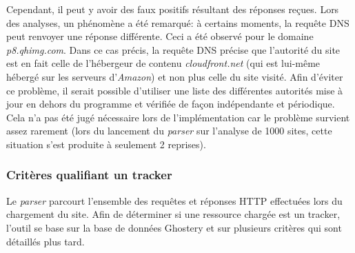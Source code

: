 %	

%	


Cependant, il peut y avoir des faux positifs résultant des réponses reçues. Lors des analyses, un phénomène a été remarqué: à certains moments, la requête DNS peut renvoyer une réponse différente. Ceci a été observé pour le domaine \textit{p8.qhimg.com}. %
Dans ce cas précis, la requête DNS précise que l'autorité du site est en fait celle de l'hébergeur de contenu \textit{cloudfront.net} (qui est lui-même hébergé sur les serveurs d'\textit{Amazon}) et non plus celle du site visité. Afin d'éviter ce problème, il serait possible d'utiliser une liste des différentes autorités mise à jour en dehors du programme et vérifiée de façon indépendante et périodique. Cela n'a pas été jugé nécessaire lors de l'implémentation car le problème survient assez rarement (lors du lancement du \textit{parser} sur l'analyse de 1000 sites, cette situation s'est produite à seulement 2 reprises).

%	

%	

\subsubsection{Critères qualifiant un tracker}
Le \textit{parser} parcourt l'ensemble des requêtes et réponses HTTP effectuées lors du chargement du site. Afin de déterminer si une ressource chargée est un tracker, l'outil se base sur la base de données Ghostery et sur plusieurs critères qui sont détaillés plus tard.
\newline

